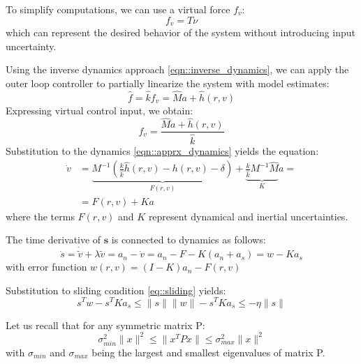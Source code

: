     To simplify computations, we can use a virtual force $f_v$:
    \begin{equation}
        f_v = T\nu
    \end{equation}
    which can represent the desired behavior of the system without introducing input uncertainty.

    Using the inverse dynamics approach \ref{eqn::inverse_dynamics}, we can apply the outer loop 
    controller to partially linearize the system with model estimates:
    \begin{equation}
        \hat{f} = \hat{k}f_v = \hat{M}a + \hat{h}(r, v)
    \end{equation}
    Expressing virtual control input, we obtain:
    \begin{equation}
    f_v = \frac{\hat{M}a + \hat{h}(r, v)}{\hat{k}}
    \end{equation}
    Substitution to the dynamics \ref{eqn::apprx_dynamics} yields the equation:
    \begin{equation}
        \begin{aligned}
        \dot{v} &= \underbrace{M^{-1}(\frac{k}{\hat{k}}\hat{h}(r, v) - h(r, v)
         - \delta)}_{F(r, v)} + \underbrace{\frac{k}{\hat{k}}M^{-1}\hat{M}}_{K}a = \\
        &= F(r, v) + Ka
        \end{aligned}
    \end{equation}
    where the terms $F(r,v)$ and $K$ represent dynamical and inertial uncertainties.

    The time derivative of $\mathbf{s}$ is connected to dynamics as follows:
    \begin{equation}
    \dot{s} = \dot{\tilde{v}} + \lambda \tilde{v} = 
    a_n - \dot{v} = a_n - F - K(a_n + a_s) = w - Ka_s 
    \end{equation}
    with error function $w(r, v) = (I - K)a_n - F(r, v) $

    Substitution to sliding condition \ref{eq::sliding} yields:
    \begin{equation}
    s^Tw- s^TKa_s  \leq \|s\|\|w\| - s^TKa_s  \leq - \eta \|s\|
    \label{eqn::sliding_condition}
    \end{equation}

    Let us recall that for any symmetric matrix P:
    \begin{equation}
        \label{eqn:property}
        \sigma^2_{min} \|x\|^2 \leq \|x^TPx\| \leq \sigma^2_{max} \|x\|^2
    \end{equation}
    with $\sigma_{min}$ and $\sigma_{max}$ being the largest and smallest 
    eigenvalues of matrix P.

